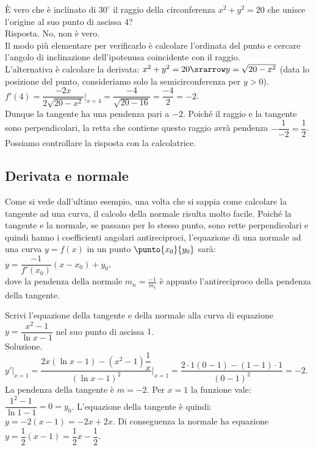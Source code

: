 \begin{esempio}
  È vero che è inclinato di $30^\circ$ il raggio  
  della circonferenza $x^2+y^2=20$ che unisce l'origine al suo punto di 
ascissa
  $4$?\\
  Risposta. No, non è vero. \\
  Il modo più elementare per verificarlo è calcolare l'ordinata
  del punto e cercare l'angolo di inclinazione dell'ipotenusa coincidente 
con 
  il raggio.\\
  L'alternativa è calcolare la derivata:
  $x^2+y^2=20\srarrow y=\sqrt{20-x^2}$ (data lo posizione del punto,
  consideriamo solo la semicirconferenza per $y>0$).\\
  $f'(4)= \dfrac{-2x}{2\sqrt{20-x^2}}\bigg|_{x=4}=\dfrac{-4}{\sqrt{20-16}}=
  \dfrac{-4}{2}=-2$.\\
  Dunque la tangente ha una pendenza pari a $-2$. Poiché il raggio e la 
  tangente sono perpendicolari, la retta che contiene questo raggio avrà 
  pendenza $-\dfrac{1}{-2}=\dfrac{1}{2}$.\\
  Possiamo controllare la risposta con la calcolatrice.
  \end{esempio}
 
\subsection{Derivata e normale}
\label{}
Come si vede dall'ultimo esempio, una volta che si sappia come calcolare 
la tangente ad una curva, il calcolo della normale risulta molto facile.
Poiché la tangente e la normale, se passano per lo stesso punto, sono rette
perpendicolari e quindi hanno i coefficienti angolari antireciproci,
l'equazione di una normale ad una curva $y=f(x)$ in un punto 
$\punto{x_0}{y_0}$
sarà:\\
$y=\dfrac{-1}{f'(x_0)}(x-x_0)+y_0$,\\
dove la pendenza della normale $m_n=\frac{-1}{m_t}$ è appunto 
l'antireciproco
della pendenza della tangente.

\begin{esempio}
Scrivi l'equazione della tangente e della normale alla curva di equazione
$y=\dfrac{x^2-1}{\ln x -1}$ nel suo punto di ascissa $1$.\\
Soluzione. $y'|_{x=1}=\dfrac{2x(\ln x-1)-(x^2-1)\dfrac{1}{x}}
{(\ln x -1)^2}\bigg|_{x=1}=\dfrac{2\cdot 1(0-1)-(1-1)\cdot 
1}{(0-1)^2}=-2$.\\
La pendenza della tangente è $m=-2$. Per $x=1$ la funzione vale:
$\dfrac{1^2-1}{\ln 1 -1}=0=y_0$. L'equazione della tangente è quindi:
$y=-2(x-1)=-2x+2x$. Di conseguenza la normale ha equazione 
$y=\dfrac{1}{2}(x-1)
=\dfrac{1}{2}x-\dfrac{1}{2}$.
\end{esempio}


